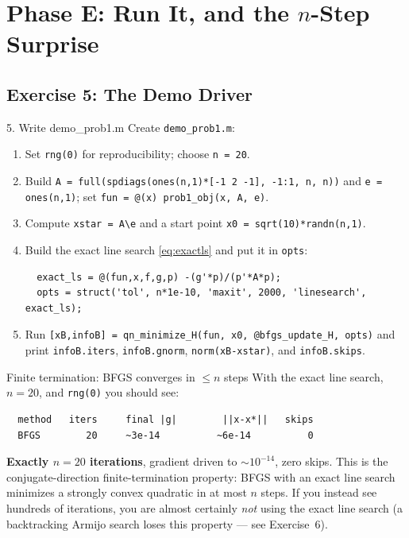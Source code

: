 \documentclass[11pt,letterpaper]{article}
\begin{document}
\section{Phase E: Run It, and the $n$-Step Surprise}\label{sec:phaseE}

\subsection{Exercise 5: The Demo Driver}

\begin{exercise}{5. Write demo\_prob1.m}
Create \texttt{demo\_prob1.m}:
\begin{enumerate}[nosep]
  \item Set \texttt{rng(0)} for reproducibility; choose \texttt{n = 20}.
  \item Build \texttt{A = full(spdiags(ones(n,1)*[-1 2 -1], -1:1, n, n))} and
    \texttt{e = ones(n,1)}; set \texttt{fun = @(x) prob1\_obj(x, A, e)}.
  \item Compute \texttt{xstar = A\textbackslash e} and a start point
    \texttt{x0 = sqrt(10)*randn(n,1)}.
  \item Build the exact line search \eqref{eq:exactls} and put it in \texttt{opts}:
\begin{verbatim}
  exact_ls = @(fun,x,f,g,p) -(g'*p)/(p'*A*p);
  opts = struct('tol', n*1e-10, 'maxit', 2000, 'linesearch', exact_ls);
\end{verbatim}
  \item Run \texttt{[xB,infoB] = qn\_minimize\_H(fun, x0, @bfgs\_update\_H, opts)} and
    print \texttt{infoB.iters}, \texttt{infoB.gnorm}, \texttt{norm(xB-xstar)}, and
    \texttt{infoB.skips}.
\end{enumerate}
\end{exercise}

\begin{checkpoint}{Finite termination: BFGS converges in $\le n$ steps}
With the exact line search, $n=20$, and \texttt{rng(0)} you should see:
\begin{verbatim}
  method   iters     final |g|        ||x-x*||   skips
  BFGS        20     ~3e-14          ~6e-14          0
\end{verbatim}
\textbf{Exactly $n=20$ iterations}, gradient driven to $\sim10^{-14}$, zero skips.
This is the conjugate-direction finite-termination property: BFGS with an exact line
search minimizes a strongly convex quadratic in at most $n$ steps. If you instead see
hundreds of iterations, you are almost certainly \emph{not} using the exact line
search (a backtracking Armijo search loses this property --- see Exercise~6).
\end{checkpoint}
\end{document}
